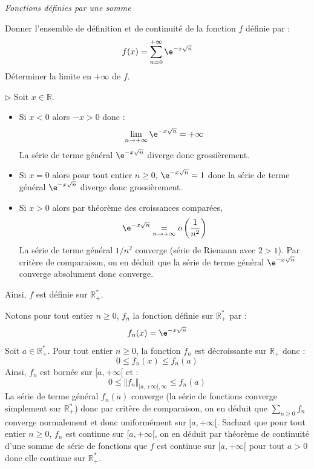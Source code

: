 \documentclass[a4paper,10pt]{report}
\newcommand{\Sum}[2]{\ensuremath{\textstyle{\sum\limits_{#1}^{#2}}}}
\begin{document}
\begin{center}
\textit{{ {\large Fonctions définies par une somme}}}
\end{center}

\medskip


\begin{Exercice}{} Donner l'ensemble de définition et de continuité de la fonction $f$ définie par :
  \[
  f(x) = \sum_{n = 0}^{ + \infty} \e^{ - x\sqrt n}
  \]
 Déterminer la limite en $ + \infty$ de $f$.
 \end{Exercice}
 
 \corr 

\noindent $\rhd$ Soit $x \in \mathbb{R}$.
\begin{itemize}
\item Si $x<0$ alors $-x>0$ donc :
$$ \lim_{n \rightarrow + \infty} \e^{ - x\sqrt n} = + \infty$$
La série de terme général $\e^{ - x\sqrt n}$ diverge donc grossièrement.
\item Si $x=0$ alors pour tout entier $n \geq 0$, $\e^{ - x\sqrt n}=1$ donc la série de terme général $\e^{ - x\sqrt n}$ diverge donc grossièrement.
\item Si $x>0$ alors par théorème des croissances comparées,
$$ \e^{ - x\sqrt n}  \underset{n \rightarrow + \infty}{=} o \left( \dfrac{1}{n^2} \right)$$
La série de terme général $1/n^2$ converge (série de Riemann avec $2>1$). Par critère de comparaison, on en déduit que la série de terme général $ \e^{ - x\sqrt n} $ converge absolument donc converge.
\end{itemize}
Ainsi, $f$ est définie sur $\mathbb{R}_+^*$.

\bigskip

\noindent Notons pour tout entier $n \geq 0$, $f_n$ la fonction définie sur $\mathbb{R}_+^*$ par :
$$f_n(x)= \e^{ - x\sqrt n}$$
Soit $a \in \mathbb{R}_+^*$. Pour tout entier $n \geq 0$, la fonction $f_n$ est décroissante sur $\mathbb{R}_+$ donc :
$$ 0 \leq f_n(x) \leq f_n(a)$$
Ainsi, $f_n$ est bornée sur $[a, + \infty[$ et :
$$ 0 \leq \Vert f_n \Vert_{[a, + \infty[, \infty} \leq f_n(a)$$
La série de terme général $f_n(a)$ converge (la série de fonctions converge simplement sur $\mathbb{R}_+^*$) donc par critère de comparaison, on en déduit que $\Sum{n\geq 0}{} f_n$ converge normalement et donc uniformément sur $[a, + \infty[$. Sachant que pour tout entier $n \geq 0$, $f_n$ est continue sur $[a, + \infty[$, on en déduit par théorème de continuité d'une somme de série de fonctions que $f$ est continue sur $[a, + \infty[$ pour tout $a>0$ donc elle continue sur $\mathbb{R}_+^*$.
\end{document}
